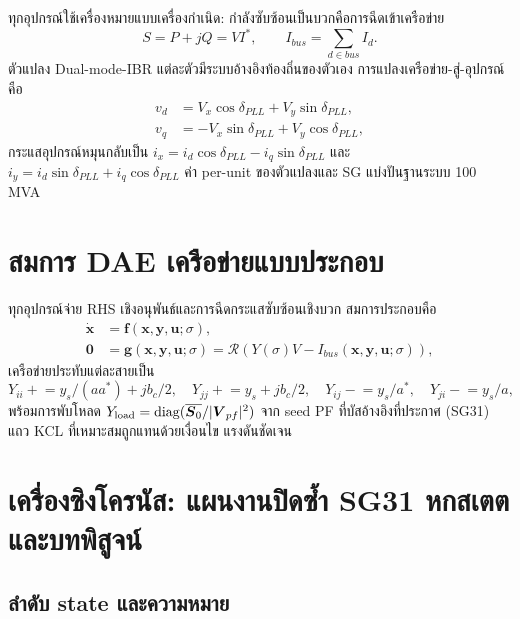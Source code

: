 \documentclass[12pt,a4paper]{article}
\newcommand{\vect}[1]{\boldsymbol{#1}}
\begin{document}
ทุกอุปกรณ์ใช้เครื่องหมายแบบเครื่องกำเนิด: กำลังซับซ้อนเป็นบวกคือการฉีดเข้าเครือข่าย
\[
S=P+jQ=V I^*,\qquad I_{bus}=\sum_{d\in bus} I_d.
\]
ตัวแปลง Dual-mode-IBR แต่ละตัวมีระบบอ้างอิงท้องถิ่นของตัวเอง การแปลงเครือข่าย-สู่-อุปกรณ์คือ
\begin{align}
v_d&=V_x\cos\delta_{PLL}+V_y\sin\delta_{PLL},\\
v_q&=-V_x\sin\delta_{PLL}+V_y\cos\delta_{PLL},
\end{align}
กระแสอุปกรณ์หมุนกลับเป็น $i_x=i_d\cos\delta_{PLL}-i_q\sin\delta_{PLL}$ และ
$i_y=i_d\sin\delta_{PLL}+i_q\cos\delta_{PLL}$
ค่า per-unit ของตัวแปลงและ SG แบ่งปันฐานระบบ 100 MVA

\section{สมการ DAE เครือข่ายแบบประกอบ}

ทุกอุปกรณ์จ่าย RHS เชิงอนุพันธ์และการฉีดกระแสซับซ้อนเชิงบวก สมการประกอบคือ
\begin{align}
\dot{\vect x}&=\vect f(\vect x,\vect y,\vect u;\sigma),\\
\vect 0&=\vect g(\vect x,\vect y,\vect u;\sigma)
          =\mathcal R\!\left(Y(\sigma)V-I_{bus}(\vect x,\vect y,\vect u;\sigma)\right),
\end{align}
เครือข่ายประทับแต่ละสายเป็น
\[
Y_{ii}\mathrel{+}=y_s/(a a^*)+jb_c/2,\quad
Y_{jj}\mathrel{+}=y_s+jb_c/2,\quad
Y_{ij}\mathrel{-}=y_s/a^*,\quad
Y_{ji}\mathrel{-}=y_s/a,
\]
พร้อมการพับโหลด $Y_{\rm load}=\operatorname{diag}(\overline{\vect S_0}/|\vect V_{pf}|^2)$
จาก seed PF ที่บัสอ้างอิงที่ประกาศ (SG31) แถว KCL ที่เหมาะสมถูกแทนด้วยเงื่อนไข
แรงดันชัดเจน

\section{เครื่องซิงโครนัส: แผนงานปิดซ้ำ SG31 หกสเตต และบทพิสูจน์}

\subsection{ลำดับ state และความหมาย}
\end{document}
